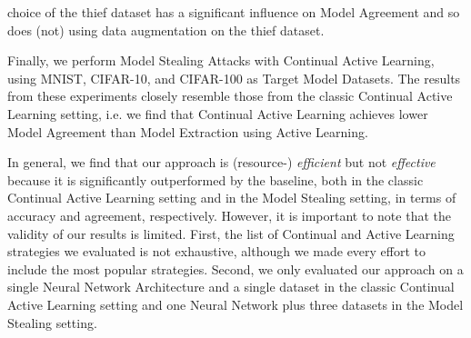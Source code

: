 choice of the thief dataset has a significant influence on Model Agreement and so does (not) using data augmentation on the thief dataset. \par
Finally, we perform Model Stealing Attacks with Continual Active Learning, using MNIST, CIFAR-10, and CIFAR-100 as Target Model Datasets.
The results from these experiments closely resemble those from the classic Continual Active Learning setting, i.e. we find that Continual
Active Learning achieves lower Model Agreement than Model Extraction using Active Learning. \par
In general, we find that our approach is (resource-) \textit{efficient} but not \textit{effective} because it is significantly outperformed
by the baseline, both in the classic Continual Active Learning setting and in the Model Stealing setting, in terms of accuracy and agreement,
respectively. However, it is important to note that the validity of our results is limited. First, the list of Continual and Active Learning
strategies we evaluated is not exhaustive, although we made every effort to include the most popular strategies. Second, we only evaluated our
approach on a single Neural Network Architecture and a single dataset in the classic Continual Active Learning setting and one Neural Network
plus three datasets in the Model Stealing setting.
